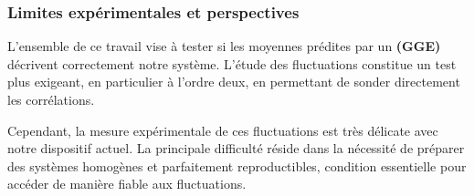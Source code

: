

\medskip

\subsubsection{Limites expérimentales et perspectives}

L’ensemble de ce travail vise à tester si les moyennes prédites par un {\bf
        \textsf{(GGE)}} décrivent correctement notre système. L’étude des fluctuations
constitue un test plus exigeant, en particulier à l’ordre deux, en permettant
de sonder directement les corrélations.

Cependant, la mesure expérimentale de ces fluctuations est très délicate avec
notre dispositif actuel. La principale difficulté réside dans la nécessité de
préparer des systèmes homogènes et parfaitement reproductibles, condition
essentielle pour accéder de manière fiable aux fluctuations.

